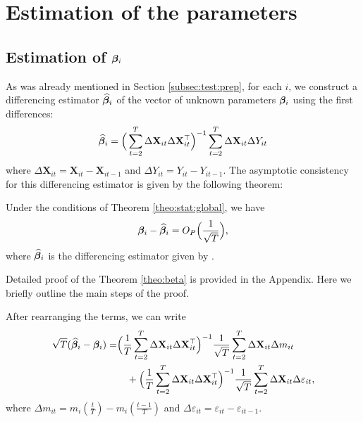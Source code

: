 \documentclass[a4paper,12pt]{article}
\makeatletter
\renewcommand{\eqref}[1]{\tagform@{\ref{#1}}}
\makeatother
\begin{document}
\section{Estimation of the parameters}\label{sec:para}

\subsection{Estimation of  $\bm{\beta}_i$}\label{subsec:para:beta}

As was already mentioned in Section \ref{subsec:test:prep}, for each $i$, we construct a differencing estimator $\widehat{\bm{\beta}}_i$ of the vector of unknown parameters $\bm{\beta}_i$ using the first differences:
\begin{align}\label{eq:beta:est2}
\widehat{\bm{\beta}}_i = \Big( \sum_{t=2}^T \Delta \mathbf{X}_{it} \Delta \mathbf{X}_{it}^\top \Big)^{-1} \sum_{t=2}^T \Delta \mathbf{X}_{it} \Delta Y_{it}
\end{align}
where $\Delta  \mathbf{X}_{it} =  \mathbf{X}_{it} -  \mathbf{X}_{it-1}$ and $\Delta Y_{it} = Y_{it} - Y_{i t-1}$. The asymptotic consistency for this differencing estimator is given by the following theorem:
\begin{theorem}\label{theo:beta}
Under the conditions of Theorem \ref{theo:stat:global}, we have
\[\bm{\beta}_i - \widehat{\bm{\beta}}_i  = O_P \Big(\frac{1}{\sqrt{T}}\Big),
\]
where $\widehat{\bm{\beta}}_i$ is the differencing estimator given by \eqref{eq:beta:est2}.
\end{theorem}

Detailed proof of the Theorem \ref{theo:beta} is provided in the Appendix. Here we briefly outline the main steps of the proof.

After rearranging the terms, we can write 
\begin{align}\label{eq:theo:beta}
\begin{split}
 \sqrt{T}( \widehat{\bm{\beta}}_i - \bm{\beta}_i) = &\Big( \frac{1}{T}\sum_{t=2}^T \Delta \mathbf{X}_{it} \Delta \mathbf{X}_{it}^\top \Big)^{-1} \frac{1}{\sqrt{T}}\sum_{t=2}^T \Delta \mathbf{X}_{it} \Delta m_{it}\\
&\quad+  \Big(\frac{1}{T} \sum_{t=2}^T \Delta \mathbf{X}_{it} \Delta \mathbf{X}_{it}^\top \Big)^{-1}\frac{1}{\sqrt{T}} \sum_{t=2}^T \Delta \mathbf{X}_{it} \Delta \varepsilon_{it},
\end{split}
\end{align}
where $\Delta m_{it} = m_i \left( \frac{t}{T} \right) - m_i \left(\frac{t-1}{T}\right)$ and $\Delta \varepsilon_{it} = \varepsilon_{it} - \varepsilon_{it-1}$.
\end{document}
